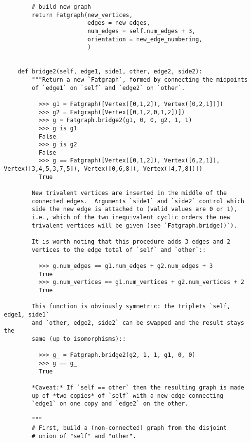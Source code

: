 \begin{lstlisting}
        # build new graph 
        return Fatgraph(new_vertices,
                        edges = new_edges,
                        num_edges = self.num_edges + 3,
                        orientation = new_edge_numbering,
                        )
    
    
    def bridge2(self, edge1, side1, other, edge2, side2):
        """Return a new `Fatgraph`, formed by connecting the midpoints
        of `edge1` on `self` and `edge2` on `other`.
        
          >>> g1 = Fatgraph([Vertex([0,1,2]), Vertex([0,2,1])])
          >>> g2 = Fatgraph([Vertex([0,1,2,0,1,2])])
          >>> g = Fatgraph.bridge2(g1, 0, 0, g2, 1, 1)
          >>> g is g1
          False
          >>> g is g2
          False
          >>> g == Fatgraph([Vertex([0,1,2]), Vertex([6,2,1]), Vertex([3,4,5,3,7,5]), Vertex([0,6,8]), Vertex([4,7,8])])
          True
          
        New trivalent vertices are inserted in the middle of the
        connected edges.  Arguments `side1` and `side2` control which
        side the new edge is attached to (valid values are 0 or 1),
        i.e., which of the two inequivalent cyclic orders the new
        trivalent vertices will be given (see `Fatgraph.bridge()`).
        
        It is worth noting that this procedure adds 3 edges and 2
        vertices to the edge total of `self` and `other`::
        
          >>> g.num_edges == g1.num_edges + g2.num_edges + 3
          True
          >>> g.num_vertices == g1.num_vertices + g2.num_vertices + 2
          True
          
        This function is obviously symmetric: the triplets `self, edge1, side1`
        and `other, edge2, side2` can be swapped and the result stays the
        same (up to isomorphisms)::

          >>> g_ = Fatgraph.bridge2(g2, 1, 1, g1, 0, 0)
          >>> g == g_
          True

        *Caveat:* If `self == other` then the resulting graph is made
        up of *two copies* of `self` with a new edge connecting
        `edge1` on one copy and `edge2` on the other.
         
        """
        # First, build a (non-connected) graph from the disjoint
        # union of "self" and "other".


\end{lstlisting}
